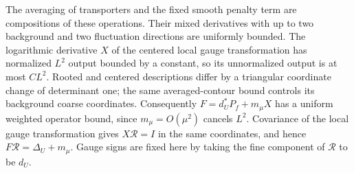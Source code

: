 The averaging of transporters and the fixed smooth penalty term are compositions of
these operations. Their mixed derivatives with up to two background and
two fluctuation directions are uniformly bounded. The
logarithmic derivative $X$ of the centered local gauge transformation has normalized $L^2$ output bounded by a
constant, so its unnormalized output is at most $CL^2$. Rooted and
centered descriptions differ by a triangular coordinate change of
determinant one; the same averaged-contour bound controls its background
coarse coordinates. Consequently $F=d_U^*P_f+m_\mu X$ has a uniform
weighted operator bound, since $m_\mu=O(\mu^2)$ cancels $L^2$.
Covariance of the local gauge transformation gives $X\mathcal R=I$ in the same coordinates, and
hence $F\mathcal R=\Delta_U+m_\mu$. Gauge signs are fixed here by
taking the fine component of $\mathcal R$ to be $d_U$.

